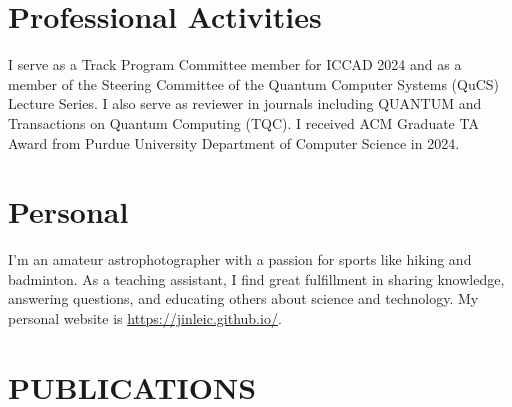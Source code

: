 \documentclass[11pt,a4paper]{article}
\begin{document}
\section*{Professional Activities}

I serve as a Track Program Committee member for ICCAD 2024 and as a member of the Steering Committee of the Quantum Computer Systems (QuCS) Lecture Series. I also serve as reviewer in journals including QUANTUM and Transactions on Quantum Computing (TQC). 
I received ACM Graduate TA Award from Purdue University Department of Computer Science in 2024.

\section*{Personal}

I'm an amateur astrophotographer with a passion for sports like hiking and badminton. As a teaching assistant, I find great fulfillment in sharing knowledge, answering questions, and educating others about science and technology. My personal website is \url{https://jinleic.github.io/}.





\section*{PUBLICATIONS}


\nocite{*} %

\begingroup %
\renewcommand{\section}[2]{}%

{}


\endgroup
\end{document}
